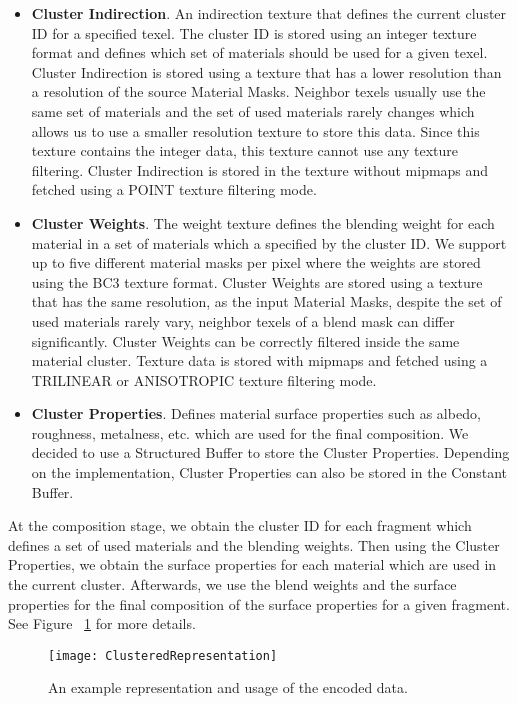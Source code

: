 \begin{itemize}  
\item \textbf{Cluster Indirection}.
An indirection texture that defines the current cluster ID for a specified texel.
The cluster ID is stored using an integer texture format and defines which set of materials should be used for a given texel.
Cluster Indirection is stored using a texture that has a lower resolution than a resolution of the source Material Masks.
Neighbor texels usually use the same set of materials and the set of used materials rarely changes which allows us to use a smaller resolution texture to store this data.
Since this texture contains the integer data, this texture cannot use any texture filtering.
Cluster Indirection is stored in the texture without mipmaps and fetched using a POINT texture filtering mode.
\item \textbf{Cluster Weights}.
The weight texture defines the blending weight for each material in a set of materials which a specified by the cluster ID.
We support up to five different material masks per pixel where the weights are stored using the BC3 texture format. 
Cluster Weights are stored using a texture that has the same resolution, as the input Material Masks, despite the set of used materials rarely vary, neighbor texels of a blend mask can differ significantly.
Cluster Weights can be correctly filtered inside the same material cluster.
Texture data is stored with mipmaps and fetched using a TRILINEAR or ANISOTROPIC texture filtering mode.
\item \textbf{Cluster Properties}.
Defines material surface properties such as albedo, roughness, metalness, etc. which are used for the final composition.
We decided to use a Structured Buffer to store the Cluster Properties.
Depending on the implementation, Cluster Properties can also be stored in the Constant Buffer.
\end{itemize}

At the composition stage, we obtain the cluster ID for each fragment which defines a set of used materials and the blending weights.
Then using the Cluster Properties, we obtain the surface properties for each material which are used in the current cluster.
Afterwards, we use the blend weights and the surface properties for the final composition of the surface properties for a given fragment. 
See Figure ~\ref{Makeev-ClusteredRepresentation} for more details.

\begin{figure}\centering
\texttt{[image: ClusteredRepresentation]}
\caption{An example representation and usage of the encoded data.} \label{Makeev-ClusteredRepresentation}
\end{figure}

